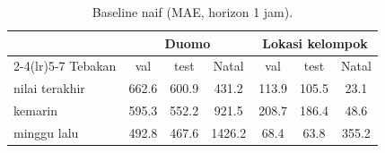 \begin{table}[t]
\centering
\scriptsize
\caption{Baseline naif (MAE, horizon 1 jam).}
\label{tab:naif}
\setlength{\tabcolsep}{3pt}
\begin{tabular}{@{}lcccccc@{}}
\toprule
 & \multicolumn{3}{c}{Duomo} & \multicolumn{3}{c}{Lokasi kelompok} \\
\cmidrule(lr){2-4}\cmidrule(lr){5-7}
Tebakan & val & test & Natal & val & test & Natal \\
\midrule
nilai terakhir & 662.6 & 600.9 & 431.2 & 113.9 & 105.5 & 23.1 \\
kemarin & 595.3 & 552.2 & 921.5 & 208.7 & 186.4 & 48.6 \\
minggu lalu & 492.8 & 467.6 & 1426.2 & 68.4 & 63.8 & 355.2 \\
\bottomrule
\end{tabular}
\end{table}